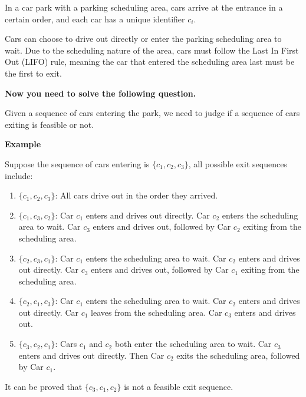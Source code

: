 
In a car park with a parking scheduling area, cars arrive at the entrance in a certain order, and each car has a unique identifier $c_i$.

Cars can choose to drive out directly or enter the parking scheduling area to wait. Due to the scheduling nature of the area, cars must follow the Last In First Out (LIFO) rule, meaning the car that entered the scheduling area last must be the first to exit. 

\textbf{Now you need to solve the following question.}

Given a sequence of cars entering the park, we need to judge if a sequence of cars exiting is feasible or not.

\textbf{Example} 

Suppose the sequence of cars entering is $ \{c_1, c_2, c_3\} $, all possible exit sequences include:

\begin{enumerate}
    \item $ \{c_1, c_2, c_3\} $: All cars drive out in the order they arrived.
    
    \item $ \{c_1, c_3, c_2 \} $: Car $ c_1 $ enters and drives out directly. Car $ c_2 $ enters the scheduling area to wait. Car $ c_3 $ enters and drives out, followed by Car $ c_2 $ exiting from the scheduling area.

    \item $ \{c_2, c_3, c_1\} $: Car $ c_1 $ enters the scheduling area to wait. Car $ c_2 $ enters and drives out directly. Car $ c_3 $ enters and drives out, followed by Car $ c_1 $ exiting from the scheduling area.

    \item $ \{c_2, c_1, c_3\} $: Car $ c_1 $ enters the scheduling area to wait. Car $ c_2 $ enters and drives out directly. Car $ c_1 $ leaves from the scheduling area. Car $ c_3 $ enters and drives out.
    
    \item $ \{ c_3, c_2, c_1 \} $: Cars $ c_1 $ and $ c_2 $ both enter the scheduling area to wait. Car $ c_3 $ enters and drives out directly. Then Car $ c_2 $ exits the scheduling area, followed by Car $ c_1 $.
\end{enumerate}

It can be proved that $\{c_3, c_1, c_2\}$ is not a feasible exit sequence.
\linespread{1}

